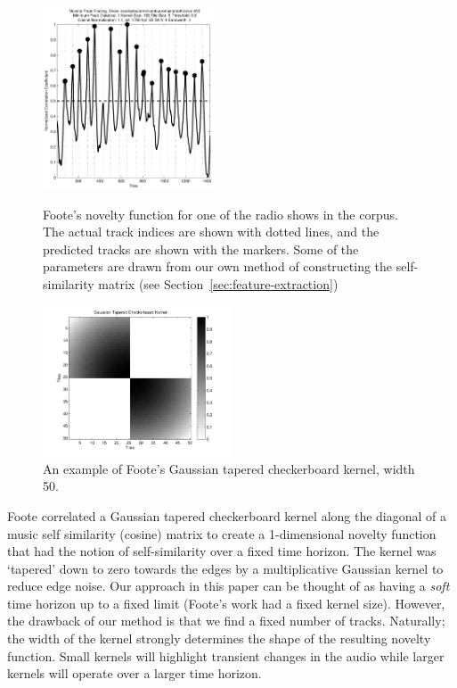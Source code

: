 \documentclass[twocolumn]{article}
\begin{document}
		\begin{figure}
			\centering
			\includegraphics[width=0.45\textwidth]{images/novelty}
			
			
			\caption{Foote's novelty function for one of the radio shows in the corpus. The actual track indices are shown with dotted lines, and the predicted tracks are shown with the markers. Some of the parameters are drawn from our own method of constructing the self-similarity matrix (see Section~\ref{sec:feature-extraction})}
			
			\bigskip
			
			\includegraphics[width=0.5\textwidth]{images/checker}
			
				\caption{An example of Foote's Gaussian tapered checkerboard kernel, width 50.}
				
			
			\label{fig:novelty}
		\end{figure} 
	
	 Foote correlated a Gaussian tapered checkerboard kernel\citep{foote2003media} along the diagonal of a music self similarity (cosine) matrix to create a 1-dimensional novelty function that had the notion of self-similarity over a fixed time horizon. The kernel was `tapered' down to zero towards the edges by a multiplicative Gaussian kernel to reduce edge noise. Our approach in this paper can be thought of as having a \textit{soft} time horizon up to a fixed limit (Foote's work had a fixed kernel size). However, the drawback of our method is that we find a fixed number of tracks. Naturally; the width of the kernel strongly determines the shape of the resulting novelty function. Small kernels will highlight transient changes in the audio while larger kernels will operate over a larger time horizon.  
	
\end{document}
